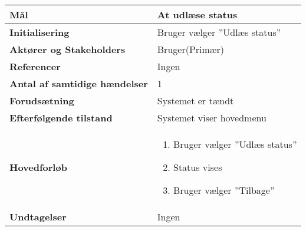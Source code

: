 \begin{table}[H] \centering
\begin{tabular}{|p{6cm}|p{8cm}|}
	\hline
		\textbf{Mål}	&
			At udlæse status \\\hline
		\textbf{Initialisering} &
			Bruger vælger ''Udlæs status'' \\\hline
		\textbf{Aktører og Stakeholders} &
			Bruger(Primær) \\\hline
		\textbf{Referencer} &
			Ingen \\\hline
		\textbf{Antal af samtidige hændelser} &
			1 \\\hline
		\textbf{Forudsætning} &
			Systemet er tændt \\\hline
		\textbf{Efterfølgende tilstand} &
			Systemet viser hovedmenu \\\hline
		\textbf{Hovedforløb} &
		
		\begin{enumerate}
			\item Bruger vælger ''Udlæs status''
			\item Status vises
			\item Bruger vælger ''Tilbage''
		\end{enumerate} \\\hline
		
		\textbf{Undtagelser} &
			Ingen \\\hline
	\end{tabular}
	\label{UC3} 
\end{table}